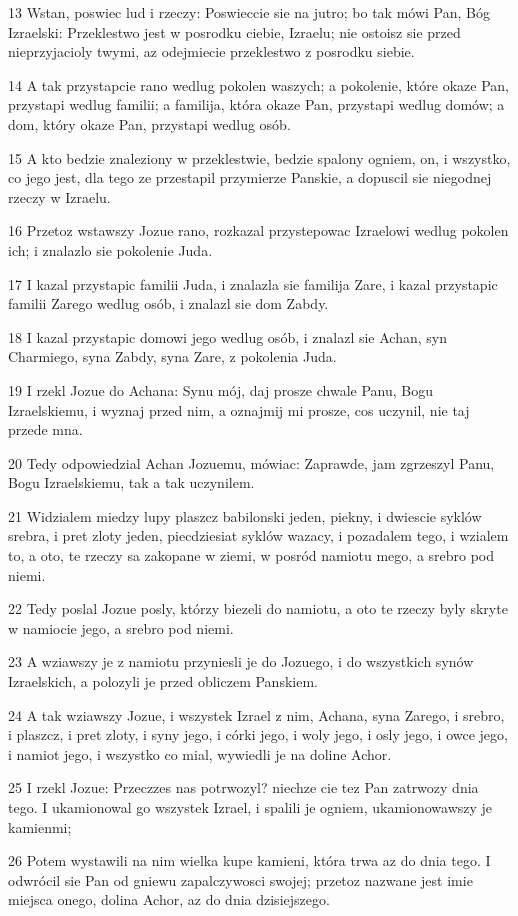 \par 13 Wstan, poswiec lud i rzeczy: Poswieccie sie na jutro; bo tak mówi Pan, Bóg Izraelski: Przeklestwo jest w posrodku ciebie, Izraelu; nie ostoisz sie przed nieprzyjacioly twymi, az odejmiecie przeklestwo z posrodku siebie.
\par 14 A tak przystapcie rano wedlug pokolen waszych; a pokolenie, które okaze Pan, przystapi wedlug familii; a familija, która okaze Pan, przystapi wedlug domów; a dom, który okaze Pan, przystapi wedlug osób.
\par 15 A kto bedzie znaleziony w przeklestwie, bedzie spalony ogniem, on, i wszystko, co jego jest, dla tego ze przestapil przymierze Panskie, a dopuscil sie niegodnej rzeczy w Izraelu.
\par 16 Przetoz wstawszy Jozue rano, rozkazal przystepowac Izraelowi wedlug pokolen ich; i znalazlo sie pokolenie Juda.
\par 17 I kazal przystapic familii Juda, i znalazla sie familija Zare, i kazal przystapic familii Zarego wedlug osób, i znalazl sie dom Zabdy.
\par 18 I kazal przystapic domowi jego wedlug osób, i znalazl sie Achan, syn Charmiego, syna Zabdy, syna Zare, z pokolenia Juda.
\par 19 I rzekl Jozue do Achana: Synu mój, daj prosze chwale Panu, Bogu Izraelskiemu, i wyznaj przed nim, a oznajmij mi prosze, cos uczynil, nie taj przede mna.
\par 20 Tedy odpowiedzial Achan Jozuemu, mówiac: Zaprawde, jam zgrzeszyl Panu, Bogu Izraelskiemu, tak a tak uczynilem.
\par 21 Widzialem miedzy lupy plaszcz babilonski jeden, piekny, i dwiescie syklów srebra, i pret zloty jeden, piecdziesiat syklów wazacy, i pozadalem tego, i wzialem to, a oto, te rzeczy sa zakopane w ziemi, w posród namiotu mego, a srebro pod niemi.
\par 22 Tedy poslal Jozue posly, którzy biezeli do namiotu, a oto te rzeczy byly skryte w namiocie jego, a srebro pod niemi.
\par 23 A wziawszy je z namiotu przyniesli je do Jozuego, i do wszystkich synów Izraelskich, a polozyli je przed obliczem Panskiem.
\par 24 A tak wziawszy Jozue, i wszystek Izrael z nim, Achana, syna Zarego, i srebro, i plaszcz, i pret zloty, i syny jego, i córki jego, i woly jego, i osly jego, i owce jego, i namiot jego, i wszystko co mial, wywiedli je na doline Achor.
\par 25 I rzekl Jozue: Przeczzes nas potrwozyl? niechze cie tez Pan zatrwozy dnia tego. I ukamionowal go wszystek Izrael, i spalili je ogniem, ukamionowawszy je kamienmi;
\par 26 Potem wystawili na nim wielka kupe kamieni, która trwa az do dnia tego. I odwrócil sie Pan od gniewu zapalczywosci swojej; przetoz nazwane jest imie miejsca onego, dolina Achor, az do dnia dzisiejszego.

